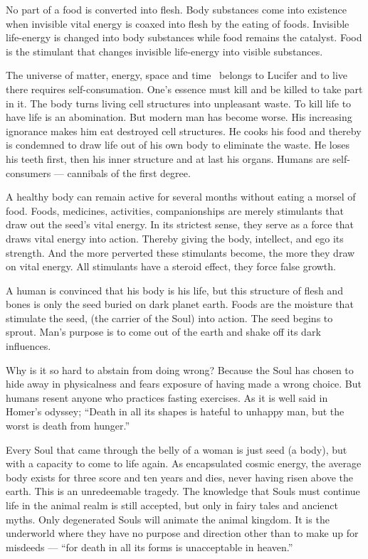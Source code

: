 \documentclass[landscape,twocolumn,letterpaper]{article}
\newcommand{\emdash}{---}
\newcommand{\mest}{matter, energy, space and time }
\begin{document}
No part of a food is converted into flesh. Body substances come into
existence when invisible vital energy is coaxed into flesh by the
eating of foods.  Invisible life-energy is changed into body
substances while food remains the catalyst. Food is the stimulant that
changes invisible life-energy into visible substances.

The universe of \mest\ belongs to Lucifer and to live there requires
self-consumation. One's essence must kill and be killed to take part
in it. The body turns living cell structures into unpleasant waste. To
kill life to have life is an abomination. But modern man has become
worse. His increasing ignorance makes him eat destroyed cell
structures. He cooks his food and thereby is condemned to draw life
out of his own body to eliminate the waste. He loses his teeth first,
then his inner structure and at last his organs. Humans are
self-consumers {\emdash} cannibals of the first degree.

A healthy body can remain active for several months without eating a
morsel of food. Foods, medicines, activities, companionships are
merely stimulants that draw out the seed's vital energy. In its
strictest sense, they serve as a force that draws vital energy into
action. Thereby giving the body, intellect, and ego its strength. And
the more perverted these stimulants become, the more they draw on
vital energy. All stimulants have a steroid effect, they force false
growth.

A human is convinced that his body is his life, but this structure of
flesh and bones is only the seed buried on dark planet earth. Foods
are the moisture that stimulate the seed, (the carrier of the Soul)
into action. The seed begins to sprout. Man's purpose is to come out
of the earth and shake off its dark influences.

Why is it so hard to abstain from doing wrong? Because the Soul has
chosen to hide away in physicalness and fears exposure of having made
a wrong choice.  But humans resent anyone who practices fasting
exercises. As it is well said in Homer's odyssey; ``Death in all its
shapes is hateful to unhappy man, but the worst is death from
hunger.''

Every Soul that came through the belly of a woman is just seed (a
body), but with a capacity to come to life again. As encapsulated
cosmic energy, the average body exists for three score and ten years
and dies, never having risen above the earth. This is an unredeemable
tragedy. The knowledge that Souls must continue life in the animal
realm is still accepted, but only in fairy tales and ancienct
myths. Only degenerated Souls will animate the animal kingdom. It is
the underworld where they have no purpose and direction other than to
make up for misdeeds {\emdash} ``for death in all its forms is
unacceptable in heaven.''
\end{document}

